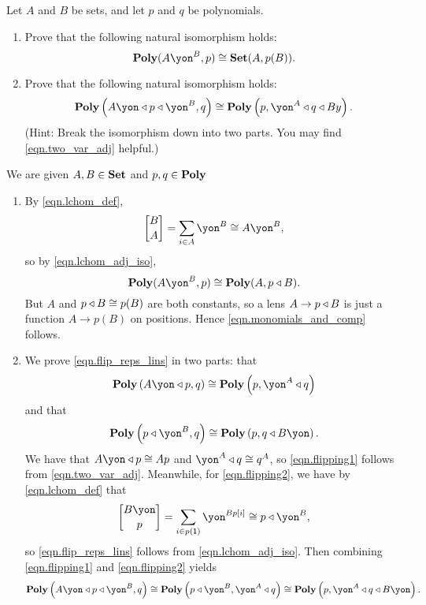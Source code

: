 \documentclass[Book-Poly]{subfiles}
\begin{document}
\begin{exercise}
Let $A$ and $B$ be sets, and let $p$ and $q$ be polynomials.
\begin{enumerate}
    \item Prove that the following natural isomorphism holds:
    \begin{equation}\label{eqn.monomials_and_comp}
    	\poly(A\yon^B,p)\iso\smset(A,p(B)).
    \end{equation}
    
    \item Prove that the following natural isomorphism holds:
    \begin{equation}\label{eqn.flip_reps_lins}
        \poly\left(A\yon\tri p\tri \yon^B, q\right)\iso\poly\left(p,\yon^A\tri q\tri By\right). 
    \end{equation}
    (Hint: Break the isomorphism down into two parts.
    You may find \eqref{eqn.two_var_adj} helpful.)
    \qedhere
\end{enumerate}
\begin{solution}
We are given $A,B\in\mathbf{Set}$ and $p,q\in\mathbf{Poly}$
\begin{enumerate}
    \item By \eqref{eqn.lchom_def},
    \[
        \lchom{B}{A}=\sum_{i\in A}\yon^{B}\iso A\yon^B,
    \]
    so by \eqref{eqn.lchom_adj_iso},
    \[
        \poly(A\yon^B,p)\iso\poly(A,p\tri B).
    \]
    But $A$ and $p\mathbin{\triangleleft} B\cong p(B)$ are both constants, so a lens $A\to p\mathbin{\triangleleft} B$ is just a function $A\to p(B)$ on positions.
    Hence \eqref{eqn.monomials_and_comp} follows.

    \item We prove \eqref{eqn.flip_reps_lins} in two parts: that
    \begin{equation} \label{eqn.flipping1}
        \poly\left(A\yon\tri p, q\right)\iso\poly\left(p,\yon^A\tri q\right)
    \end{equation}
    and that
    \begin{equation} \label{eqn.flipping2}
        \poly\left(p \tri \yon^B, q\right)\cong\poly\left(p, q\tri B\yon\right).
    \end{equation}
    We have that $A\yon \tri p \iso Ap$ and $\yon^A \tri q \iso q^A$, so \eqref{eqn.flipping1} follows from \eqref{eqn.two_var_adj}.
    Meanwhile, for \eqref{eqn.flipping2}, we have by \eqref{eqn.lchom_def} that
    \[
        \lchom{B\yon}{p}=\sum_{i\in p(\1)}\yon^{Bp[i]}\iso p\tri\yon^B,
    \]
    so \eqref{eqn.flip_reps_lins} follows from \eqref{eqn.lchom_adj_iso}.
    Then combining \eqref{eqn.flipping1} and \eqref{eqn.flipping2} yields
    \[
        \poly\left(A\yon\tri p\tri\yon^B,q\right)\iso\poly\left(p\tri\yon^B,\yon^A\tri q\right)\iso\poly\left(p,\yon^A\tri q\tri B\yon\right).
    \]
\end{enumerate}
\end{solution}
\end{exercise}
\end{document}
